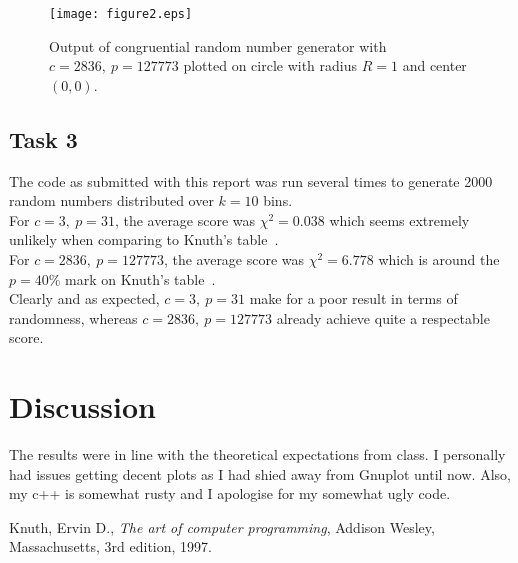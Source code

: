 \documentclass[11pt,a4paper]{article}
\begin{document}
\begin{figure}[ht]
\begin{center}
\texttt{[image: figure2.eps]} 
\end{center}
\caption{Output of congruential random number generator with $c = 2836, \: p = 127773$ plotted on circle with radius $R=1$ and center $(0, 0)$.}
\label{fig:2}
\end{figure}



\subsection{Task 3}
The code as submitted with this report was run several times to generate 2000 random numbers distributed over $k=10$ bins.\\
For $c = 3, \: p = 31$, the average score was $\chi^2 = 0.038$ which seems extremely unlikely when comparing to Knuth's table~\cite{knuth}.\\
For $c = 2836, \: p = 127773$, the average score was $\chi^2 = 6.778$ which is around the $p=40\%$ mark on Knuth's table~\cite{knuth}.\\
Clearly and as expected, $c = 3, \: p = 31$ make for a poor result in terms of randomness, whereas $c = 2836, \: p = 127773$ already achieve quite a respectable score. 

\section{Discussion}
The results were in line with the theoretical expectations from class. I personally had issues getting decent plots as I had shied away from Gnuplot until now. Also, my c++ is somewhat rusty and I apologise for my somewhat ugly code.

\begin{thebibliography}{99}


  Knuth, Ervin D.,
  \emph{The art of computer programming}, 
  Addison Wesley, Massachusetts,
  3rd edition,
  1997.


\end{thebibliography}
\end{document}
